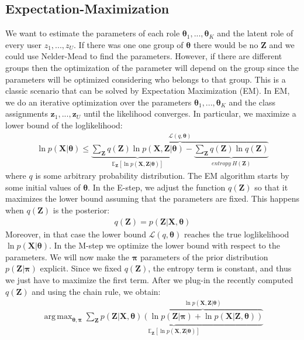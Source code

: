 \documentclass[smallextended]{svjour3}          %
\DeclareMathOperator*{\argmax}{arg\,max}
\begin{document}
\subsection{Expectation-Maximization} 
We want to estimate the parameters of each role $\boldsymbol{\theta}_1,...,\boldsymbol{\theta}_K$ and the latent role of every user $z_1,...,z_U$. If there was one one group of $\boldsymbol{\theta}$ there would be no $\mathbf{Z}$ and we could use Nelder-Mead to find the parameters. However, if there are different groups then the optimization of the parameter will depend on the group since the parameters will be optimized considering who belongs to that group. This is a classic scenario that can be solved by Expectation Maximization (EM). In EM, we do an iterative optimization over the parameters $\boldsymbol{\theta}_1,...,\boldsymbol{\theta}_K$ and the class assignments $\boldsymbol{z}_1,...,\boldsymbol{z}_U$ until the likelihood converges. In particular, we maximize a lower bound of the loglikelihood:
\begin{align}
\ln p(\mathbf{X} | \boldsymbol{\theta}) 
\leq
\overbrace{
\underbrace{
\sum_{\mathbf{Z}} q(\mathbf{Z})\ln p(\mathbf{X, \mathbf{Z} | \boldsymbol{\theta}})
}_{\mathbb{E}_\mathbf{Z}\left[\ln p(\mathbf{X, \mathbf{Z} | \boldsymbol{\theta}})\right]} 
-
\underbrace{
\sum_{\mathbf{Z}}
q(\mathbf{Z}) 
\ln q(\mathbf{Z})
}_{entropy~H(\mathbf{Z})}
}^{\mathcal{L}(q, \boldsymbol{\theta})}
\end{align}
where $q$ is some arbitrary probability distribution. The EM algorithm starts by some initial values of $\boldsymbol{\theta}$. In the E-step, we adjust the function $q(\mathbf{Z})$ so that it maximizes the lower bound assuming that the parameters are fixed. This happens when $q(\mathbf{Z})$ is the posterior:
\begin{align}
q(\mathbf{Z}) = p(\mathbf{Z} | \mathbf{X}, \boldsymbol{\theta}) 
\end{align}
Moreover, in that case the lower bound $\mathcal{L}(q,\boldsymbol{\theta})$ reaches the true loglikelihood $\ln p(\boldsymbol{X} | \boldsymbol{\theta})$. In the M-step we optimize the lower bound with respect to the parameters. We will now make the $\boldsymbol{\pi}$ parameters of the prior distribution $p(\mathbf{Z} | \boldsymbol{\pi})$ explicit. Since we fixed $q(\mathbf{Z})$, the entropy term is constant, and thus we just have to maximize the first term. After we plug-in the recently computed $q(\mathbf{Z})$ and using the chain rule, we obtain:
\begin{align*}
\argmax_{\boldsymbol{\theta}, \boldsymbol{\pi}} 
\underbrace{
\sum_{\mathbf{Z}} p(\mathbf{Z} | \mathbf{X}, \boldsymbol{\theta})
\overbrace{
\left(\ln p(\mathbf{Z} | \boldsymbol{\pi})  + \ln p(\mathbf{X  | \mathbf{Z}, \boldsymbol{\theta}})\right)
}^{\ln p(\mathbf{X}, \mathbf{Z} | \boldsymbol{\theta})}
}_{\mathbb{E}_\mathbf{Z}\left[\ln p(\mathbf{X, \mathbf{Z} | \boldsymbol{\theta}})\right]} 
\end{align*}
\end{document}
